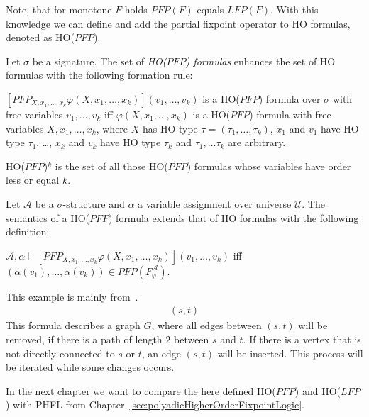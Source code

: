 Note, that for monotone $F$ holds $\mathit{PFP}(F)$ equals $\mathit{LFP}(F)$. With this knowledge we can define and
add the partial fixpoint operator to HO formulas, denoted as HO($\mathit{PFP}$).

\begin{definition}
    Let $\sigma$ be a signature. The set of \emph{HO($\mathit{PFP}$) formulas} enhances the set of HO formulas with the
    following formation rule:
    \begin{compactitem}
        \item $[\mathit{PFP}_{X, x_1, \dots, x_k}\varphi(X, x_1, \dots, x_k)](v_1, \dots, v_k)$ is a HO($\mathit{PFP}$) formula over
        $\sigma$ with free variables $v_1, \dots, v_k$ iff $\varphi(X, x_1, \dots, x_k)$ is a HO($\mathit{PFP}$) formula with
        free variables $X, x_1, \dots, x_k$, where $X$ has HO type $\tau = (\tau_1, \dots, \tau_k)$, $x_1$ and $v_1$
        have HO type $\tau_1$, \dots, $x_k$ and $v_k$ have HO type $\tau_k$ and $\tau_1, \dots \tau_k$ are arbitrary.
    \end{compactitem}
\end{definition}

HO($\mathit{PFP}$)$^k$ is the set of all those HO($\mathit{PFP}$) formulas whose variables have order less or equal $k$.

\begin{definition}
    Let $\mathcal{A}$ be a $\sigma$-structure and $\alpha$ a variable assignment over universe $\mathcal{U}$. The
    semantics of a HO($\mathit{PFP}$) formula extends that of HO formulas with the following definition:
    \begin{compactitem}
        \item $\mathcal{A}, \alpha \models [\mathit{PFP}_{X, x_1, \dots, x_k}\varphi(X, x_1, \dots, x_k)](v_1, \dots, v_k)$
        iff $(\alpha(v_1), \dots, \alpha(v_k)) \in \mathit{PFP}(F_\varphi^\mathcal{A})$.
    \end{compactitem}
\end{definition}

\begin{example}
    This example is mainly from~\cite{abiteboul1995computing}.
    \begin{align*}
    [PFP_{G, x, y}(&G(x, y) \wedge \neg \exists z\colon\odot.\,(G(x, z) \wedge G(z, y)) \vee \\
    &\exists z\colon\odot.\,(\neg G(x, z)\wedge\neg G(z, x) \wedge \neg G(y, z) \wedge G(z, y)))](s, t)
    \end{align*}
    This formula describes a graph $G$, where all edges between $(s, t)$ will be removed, if there is a path of
    length $2$ between $s$ and $t$. If there is a vertex that is not directly connected to $s$ or $t$, an edge $(s,
    t)$ will be inserted. This process will be iterated while some changes occurs.

\end{example}

In the next chapter we want to compare the here defined HO($\mathit{PFP}$) and HO($\mathit{LFP}$) with PHFL from
Chapter~\ref{sec:polyadicHigherOrderFixpointLogic}.